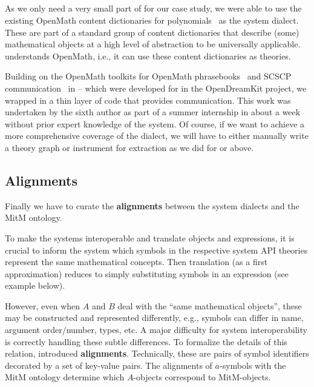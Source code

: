 \subsection{\Singular}

As we only need a very small part of \Singular for our case study, we were able to use the existing OpenMath content dictionaries for polynomials~\cite{OMCD:poly:on} as the \Singular system dialect.
These are part of a standard group of content dictionaries that describe (some) mathematical objects at a high level of abstraction to be universally applicable.
\OMMT understands OpenMath, i.e., it can use these content dictionaries as \OMMT theories.

Building on the OpenMath toolkits for OpenMath phrasebooks~\cite{py-openmath:on} and SCSCP communication~\cite{py-scscp:on} in {\Python} -- which were developed for \Sage in the
OpenDreamKit project, we wrapped \Singular in a thin layer of \Python code that provides \SCSCP communication.
This work was undertaken by the sixth author as part of a summer internship in about a week without prior expert knowledge of the system. Of course, if we want to achieve a more comprehensive coverage of the \Singular dialect, we will have to either manually write a theory graph or instrument \Singular for extraction as we did for \Sage or \GAP above. 

\subsection{Alignments}\label{sec:integrating:alignments}

Finally we have to curate the \textbf{alignments} between the system dialects and the MitM ontology. 

To make the systems interoperable and translate objects and expressions, it is crucial to inform the system which symbols in the 
respective system API theories represent the same mathematical concepts. Then translation (as a first approximation) reduces to simply substituting symbols in an expression (see example below).\medskip

However, even when $A$ and $B$ deal with the ``same mathematical objects'', these may be constructed and represented differently, e.g., symbols can differ in name,
argument order/number, types, etc.
A major difficulty for system interoperability is correctly handling these subtle differences.
To formalize the details of this relation, \cite{MueGauKal:cacfms17} introduced \OMMT \textbf{alignments}.
Technically, these are pairs of \OMMT symbol identifiers decorated by a set of key-value pairs.
The alignments of $a$-symbols with the MitM ontology determine which $A$-objects correspond to MitM-objects.

